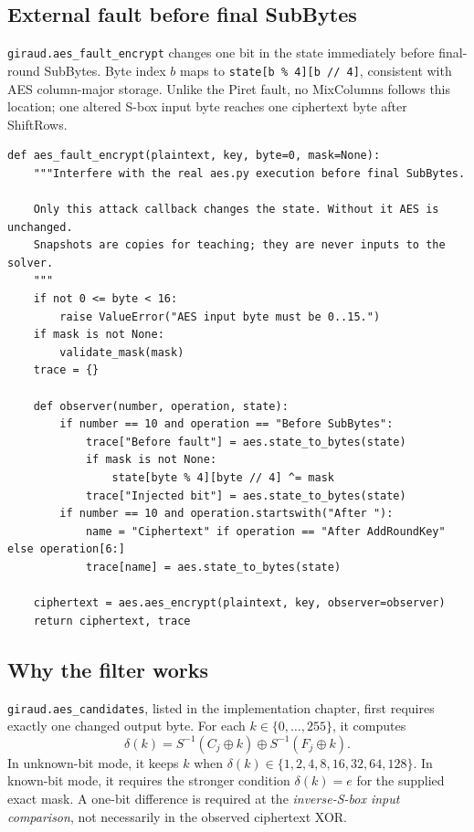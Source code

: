 \documentclass[11pt,a4paper]{report}
\newcommand{\xor}{\mathbin{\oplus}}
\begin{document}
\subsection{External fault before final SubBytes}
\texttt{giraud.aes\_fault\_encrypt} changes one bit in the state immediately before final-round SubBytes. Byte index $b$ maps to \texttt{state[b \% 4][b // 4]}, consistent with AES column-major storage. Unlike the Piret fault, no MixColumns follows this location; one altered S-box input byte reaches one ciphertext byte after ShiftRows.
\begin{lstlisting}[style=pycode,caption={External single-bit fault before final AES SubBytes}]
def aes_fault_encrypt(plaintext, key, byte=0, mask=None):
    """Interfere with the real aes.py execution before final SubBytes.

    Only this attack callback changes the state. Without it AES is unchanged.
    Snapshots are copies for teaching; they are never inputs to the solver.
    """
    if not 0 <= byte < 16:
        raise ValueError("AES input byte must be 0..15.")
    if mask is not None:
        validate_mask(mask)
    trace = {}

    def observer(number, operation, state):
        if number == 10 and operation == "Before SubBytes":
            trace["Before fault"] = aes.state_to_bytes(state)
            if mask is not None:
                state[byte % 4][byte // 4] ^= mask
            trace["Injected bit"] = aes.state_to_bytes(state)
        if number == 10 and operation.startswith("After "):
            name = "Ciphertext" if operation == "After AddRoundKey" else operation[6:]
            trace[name] = aes.state_to_bytes(state)

    ciphertext = aes.aes_encrypt(plaintext, key, observer=observer)
    return ciphertext, trace
\end{lstlisting}

\subsection{Why the filter works}
\texttt{giraud.aes\_candidates}, listed in the implementation chapter, first requires exactly one changed output byte. For each $k\in\{0,\ldots,255\}$, it computes
\[
\delta(k)=S^{-1}(C_j\xor k)\xor S^{-1}(F_j\xor k).
\]
In unknown-bit mode, it keeps $k$ when $\delta(k)\in\{1,2,4,8,16,32,64,128\}$. In known-bit mode, it requires the stronger condition $\delta(k)=e$ for the supplied exact mask. A one-bit difference is required at the \emph{inverse-S-box input comparison}, not necessarily in the observed ciphertext XOR.
\end{document}
